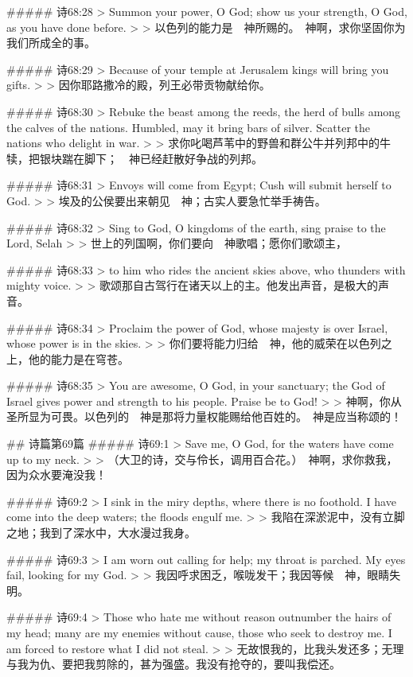 ##### 诗68:28
> Summon your power, O God; show us your strength, O God, as you have done before.
>
> 以色列的能力是　神所赐的。　神啊，求你坚固你为我们所成全的事。


##### 诗68:29
> Because of your temple at Jerusalem kings will bring you gifts.
>
> 因你耶路撒冷的殿，列王必带贡物献给你。


##### 诗68:30
> Rebuke the beast among the reeds, the herd of bulls among the calves of the nations. Humbled, may it bring bars of silver. Scatter the nations who delight in war.
>
> 求你叱喝芦苇中的野兽和群公牛并列邦中的牛犊，把银块踹在脚下；　神已经赶散好争战的列邦。


##### 诗68:31
> Envoys will come from Egypt; Cush will submit herself to God.
>
> 埃及的公侯要出来朝见　神；古实人要急忙举手祷告。


##### 诗68:32
> Sing to God, O kingdoms of the earth, sing praise to the Lord, Selah
>
> 世上的列国啊，你们要向　神歌唱；愿你们歌颂主，


##### 诗68:33
> to him who rides the ancient skies above, who thunders with mighty voice.
>
> 歌颂那自古驾行在诸天以上的主。他发出声音，是极大的声音。


##### 诗68:34
> Proclaim the power of God, whose majesty is over Israel, whose power is in the skies.
>
> 你们要将能力归给　神，他的威荣在以色列之上，他的能力是在穹苍。


##### 诗68:35
> You are awesome, O God, in your sanctuary; the God of Israel gives power and strength to his people. Praise be to God!
>
> 神啊，你从圣所显为可畏。以色列的　神是那将力量权能赐给他百姓的。　神是应当称颂的！


## 诗篇第69篇
##### 诗69:1
> Save me, O God, for the waters have come up to my neck.
>
> （大卫的诗，交与伶长，调用百合花。）　神啊，求你救我，因为众水要淹没我！


##### 诗69:2
> I sink in the miry depths, where there is no foothold. I have come into the deep waters; the floods engulf me.
>
> 我陷在深淤泥中，没有立脚之地；我到了深水中，大水漫过我身。


##### 诗69:3
> I am worn out calling for help; my throat is parched. My eyes fail, looking for my God.
>
> 我因呼求困乏，喉咙发干；我因等候　神，眼睛失明。


##### 诗69:4
> Those who hate me without reason outnumber the hairs of my head; many are my enemies without cause, those who seek to destroy me. I am forced to restore what I did not steal.
>
> 无故恨我的，比我头发还多；无理与我为仇、要把我剪除的，甚为强盛。我没有抢夺的，要叫我偿还。


